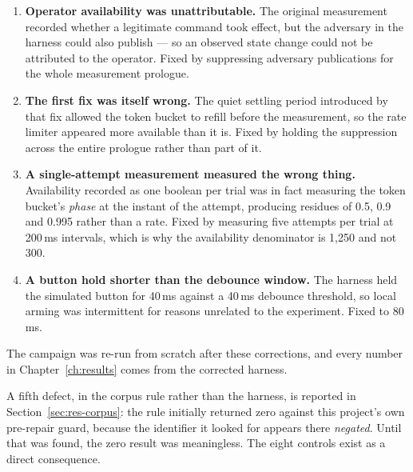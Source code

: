 \begin{enumerate}[leftmargin=1.8em,itemsep=6pt]
  \item \textbf{Operator availability was unattributable.} The original measurement recorded
        whether a legitimate command took effect, but the adversary in the harness could also
        publish  — so an observed state change could not be attributed to the
        operator. Fixed by suppressing adversary  publications for the whole
        measurement prologue.
  \item \textbf{The first fix was itself wrong.} The quiet settling period introduced by that
        fix allowed the token bucket to refill before the measurement, so the rate limiter
        appeared more available than it is. Fixed by holding the suppression across the entire
        prologue rather than part of it.
  \item \textbf{A single-attempt measurement measured the wrong thing.} Availability recorded as
        one boolean per trial was in fact measuring the token bucket's \emph{phase} at the
        instant of the attempt, producing residues of 0.5, 0.9 and 0.995 rather than a rate.
        Fixed by measuring five attempts per trial at 200\,ms intervals, which is why the
        availability denominator is 1,250 and not 300.
  \item \textbf{A button hold shorter than the debounce window.} The harness held the simulated
        button for 40\,ms against a 40\,ms debounce threshold, so local arming was intermittent
        for reasons unrelated to the experiment. Fixed to 80\,ms.
\end{enumerate}

The campaign was re-run from scratch after these corrections, and every number in
Chapter~\ref{ch:results} comes from the corrected harness.

A fifth defect, in the corpus rule rather than the harness, is reported in
Section~\ref{sec:res-corpus}: the rule initially returned zero against this project's own
pre-repair guard, because the identifier it looked for appears there \emph{negated}. Until that
was found, the zero result was meaningless. The eight controls exist as a direct consequence.
